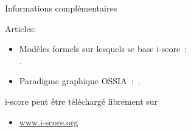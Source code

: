 \begin{block}{Informations complémentaires}
      {Articles:
      \begin{itemize}
        \item Modèles formels sur lesquels se base i-score~:~\\\cite{allombert_system_2007,arias_modelling_2014}.
        \item Paradigme graphique OSSIA~:~\cite{celerier_ossia:_2015}.
      \end{itemize}
      \vspace{0.1in}\noindent i-score peut être téléchargé librement sur
      \begin{itemize}
        \item \url{www.i-score.org}
      \end{itemize}}
\end{block}